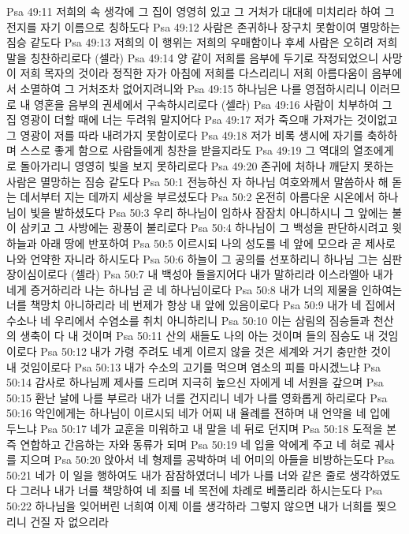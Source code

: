 Psa 49:11  저희의 속 생각에 그 집이 영영히 있고 그 거처가 대대에 미치리라 하여 그 전지를 자기 이름으로 칭하도다
Psa 49:12  사람은 존귀하나 장구치 못함이여 멸망하는 짐승 같도다
Psa 49:13  저희의 이 행위는 저희의 우매함이나 후세 사람은 오히려 저희말을 칭찬하리로다 (셀라)
Psa 49:14  양 같이 저희를 음부에 두기로 작정되었으니 사망이 저희 목자의 것이라 정직한 자가 아침에 저희를 다스리리니 저희 아름다움이 음부에서 소멸하여 그 거처조차 없어지려니와
Psa 49:15  하나님은 나를 영접하시리니 이러므로 내 영혼을 음부의 권세에서 구속하시리로다 (셀라)
Psa 49:16  사람이 치부하여 그 집 영광이 더할 때에 너는 두려워 말지어다
Psa 49:17  저가 죽으매 가져가는 것이없고 그 영광이 저를 따라 내려가지 못함이로다
Psa 49:18  저가 비록 생시에 자기를 축하하며 스스로 좋게 함으로 사람들에게 칭찬을 받을지라도
Psa 49:19  그 역대의 열조에게로 돌아가리니 영영히 빛을 보지 못하리로다
Psa 49:20  존귀에 처하나 깨닫지 못하는 사람은 멸망하는 짐승 같도다
Psa 50:1  전능하신 자 하나님 여호와께서 말씀하사 해 돋는 데서부터 지는 데까지 세상을 부르셨도다
Psa 50:2  온전히 아름다운 시온에서 하나님이 빛을 발하셨도다
Psa 50:3  우리 하나님이 임하사 잠잠치 아니하시니 그 앞에는 불이 삼키고 그 사방에는 광풍이 불리로다
Psa 50:4  하나님이 그 백성을 판단하시려고 윗 하늘과 아래 땅에 반포하여
Psa 50:5  이르시되 나의 성도를 네 앞에 모으라 곧 제사로 나와 언약한 자니라 하시도다
Psa 50:6  하늘이 그 공의를 선포하리니 하나님 그는 심판장이심이로다 (셀라)
Psa 50:7  내 백성아 들을지어다 내가 말하리라 이스라엘아 내가 네게 증거하리라 나는 하나님 곧 네 하나님이로다
Psa 50:8  내가 너의 제물을 인하여는 너를 책망치 아니하리라 네 번제가 항상 내 앞에 있음이로다
Psa 50:9  내가 네 집에서 수소나 네 우리에서 수염소를 취치 아니하리니
Psa 50:10  이는 삼림의 짐승들과 천산의 생축이 다 내 것이며
Psa 50:11  산의 새들도 나의 아는 것이며 들의 짐승도 내 것임이로다
Psa 50:12  내가 가령 주려도 네게 이르지 않을 것은 세계와 거기 충만한 것이 내 것임이로다
Psa 50:13  내가 수소의 고기를 먹으며 염소의 피를 마시겠느냐
Psa 50:14  감사로 하나님께 제사를 드리며 지극히 높으신 자에게 네 서원을 갚으며
Psa 50:15  환난 날에 나를 부르라 내가 너를 건지리니 네가 나를 영화롭게 하리로다
Psa 50:16  악인에게는 하나님이 이르시되 네가 어찌 내 율례를 전하며 내 언약을 네 입에 두느냐
Psa 50:17  네가 교훈을 미워하고 내 말을 네 뒤로 던지며
Psa 50:18  도적을 본즉 연합하고 간음하는 자와 동류가 되며
Psa 50:19  네 입을 악에게 주고 네 혀로 궤사를 지으며
Psa 50:20  앉아서 네 형제를 공박하며 네 어미의 아들을 비방하는도다
Psa 50:21  네가 이 일을 행하여도 내가 잠잠하였더니 네가 나를 너와 같은 줄로 생각하였도다 그러나 내가 너를 책망하여 네 죄를 네 목전에 차례로 베풀리라 하시는도다
Psa 50:22  하나님을 잊어버린 너희여 이제 이를 생각하라 그렇지 않으면 내가 너희를 찢으리니 건질 자 없으리라
